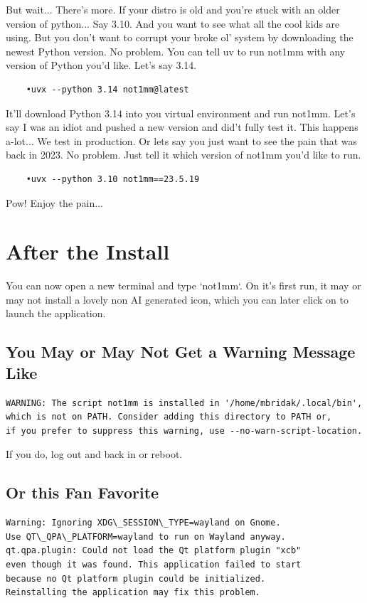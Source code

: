 \documentclass{article}
\begin{document}
But wait... There's more. If your distro is old and you're stuck with an older version of python... Say 3.10. And you want to see what all the cool kids are using. But you don't want to corrupt your broke ol' system by downloading the newest Python version. No problem. You can tell uv to run not1mm with any version of Python you'd like. Let's say 3.14.

\begin{verbatim}
    •uvx --python 3.14 not1mm@latest
\end{verbatim}

It'll download Python 3.14 into you virtual environment and run not1mm. Let's say I was an idiot and pushed a new version and did't fully test it. This happens a-lot... We test in production. Or lets say you just want to see the pain that was back in 2023. No problem. Just tell it which version of not1mm you'd like to run.

\begin{verbatim}
    •uvx --python 3.10 not1mm==23.5.19
\end{verbatim}

Pow! Enjoy the pain... 
\newpage
\section{After the Install}
You can now open a new terminal and type `not1mm`. On it's first run, it may or may not install a lovely non AI generated icon, which you can later click on to launch the application.

\subsection{You May or May Not Get a Warning Message Like}

\begin{verbatim}
WARNING: The script not1mm is installed in '/home/mbridak/.local/bin',
which is not on PATH. Consider adding this directory to PATH or,
if you prefer to suppress this warning, use --no-warn-script-location.
\end{verbatim}

If you do, log out and back in or reboot.

\subsection{Or this Fan Favorite}

\begin{verbatim}
Warning: Ignoring XDG\_SESSION\_TYPE=wayland on Gnome.
Use QT\_QPA\_PLATFORM=wayland to run on Wayland anyway.
qt.qpa.plugin: Could not load the Qt platform plugin "xcb"
even though it was found. This application failed to start
because no Qt platform plugin could be initialized.
Reinstalling the application may fix this problem.
\end{verbatim}
\end{document}
